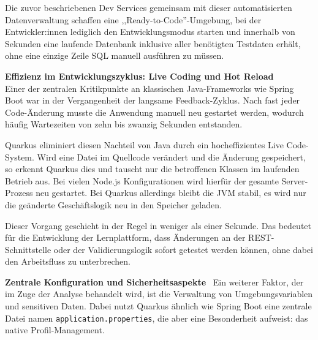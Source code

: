 Die zuvor beschriebenen Dev Services gemeinsam mit dieser automatisierten Datenverwaltung schaffen eine ,,Ready-to-Code''-Umgebung, bei der Entwickler:innen lediglich den Entwicklungsmodus starten und innerhalb von Sekunden eine laufende Datenbank inklusive aller benötigten Testdaten erhält, ohne eine einzige Zeile SQL manuell ausführen zu müssen.


\vspace{0.7cm}
\textbf{Effizienz im Entwicklungszyklus: Live Coding und Hot Reload} \\
Einer der zentralen Kritikpunkte an klassischen Java-Frameworks wie Spring Boot war in der Vergangenheit der langsame Feedback-Zyklus. Nach fast jeder Code-Änderung musste die Anwendung manuell neu gestartet werden, wodurch häufig Wartezeiten von zehn bis zwanzig Sekunden entstanden. 

Quarkus eliminiert diesen Nachteil von Java durch ein hocheffizientes Live Code-System. Wird eine Datei im Quellcode verändert und die Änderung gespeichert, so erkennt Quarkus dies und tauscht nur die betroffenen Klassen im laufenden Betrieb aus. Bei vielen Node.js Konfigurationen wird hierfür der gesamte Server-Prozess neu gestartet. Bei Quarkus allerdings bleibt die JVM stabil, es wird nur die geänderte Geschäftslogik neu in den Speicher geladen. \cite{QuarkusLiveReload}

Dieser Vorgang geschieht in der Regel in weniger als einer Sekunde. Das bedeutet für die Entwicklung der Lernplattform, dass Änderungen an der REST-Schnittstelle oder der Validierungslogik sofort getestet werden können, ohne dabei den Arbeitsfluss zu unterbrechen.


\vspace{0.7cm}
\textbf{Zentrale Konfiguration und Sicherheitsaspekte} \
Ein weiterer Faktor, der im Zuge der Analyse behandelt wird, ist die Verwaltung von Umgebungsvariablen und sensitiven Daten. Dabei nutzt Quarkus ähnlich wie Spring Boot eine zentrale Datei namen \texttt{application.properties}, die aber eine Besonderheit aufweist: das native Profil-Management. \cite{DevModeDifferences}

